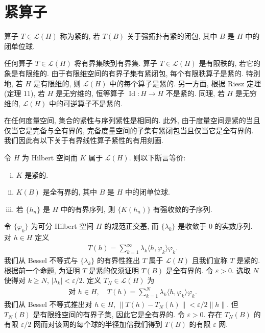 \documentclass[../../main.tex]{subfiles}
\begin{document}
\section{紧算子}\label{section:ch16-compact}

\begin{definition}[紧算子]\label{definition:ch16-compact}
算子 $T\in\mathcal{L}(H)$ 称为紧的, 若 $T(B)$ 关于强拓扑有紧的闭包, 其中 $B$ 是 $H$ 中的闭单位球.
\end{definition}

任何算子 $T\in\mathcal{L}(H)$ 将有界集映到有界集. 算子 $T\in\mathcal{L}(H)$ 是有限秩的, 若它的象是有限维的. 由于有限维空间的有界子集有紧闭包, 每个有限秩算子是紧的. 特别地, 若 $H$ 是有限维的, 则 $\mathcal{L}(H)$ 中的每个算子是紧的. 另一方面, 根据 Riesz 定理(定理 11), 若 $H$ 是无穷维的, 恒等算子 $\operatorname{Id}:H\to H$ 不是紧的. 同理, 若 $H$ 是无穷维的, $\mathcal{L}(H)$ 中的可逆算子不是紧的.

在任何度量空间, 集合的紧性与序列紧性是相同的. 此外, 由于度量空间是紧的当且仅当它是完备与全有界的, 完备度量空间的子集有紧闭包当且仅当它是全有界的. 我们因此有以下关于有界线性算子紧性的有用刻画.

\begin{proposition}\label{proposition:ch16-compact-equiv}
令 $H$ 为 Hilbert 空间而 $K$ 属于 $\mathcal{L}(H)$. 则以下断言等价:
\begin{enumerate}[(i)]
\item $K$ 是紧的.
\item $K(B)$ 是全有界的, 其中 $B$ 是 $H$ 中的闭单位球.
\item 若 $\{h_{n}\}$ 是 $H$ 中的有界序列, 则 $\{K(h_{n})\}$ 有强收敛的子序列.
\end{enumerate}
\end{proposition}

\begin{example}\label{example:ch16-diagonal-compact}
令 $\{\varphi_{k}\}$ 为可分 Hilbert 空间 $H$ 的规范正交基, 而 $\{\lambda_{k}\}$ 是收敛于 $0$ 的实数序列. 对 $h\in H$ 定义
\begin{align*}
T(h)=\sum_{k=1}^{\infty}\lambda_{k}\langle h,\varphi_{k}\rangle\varphi_{k}.
\end{align*}
我们从 Bessel 不等式与 $\{\lambda_{k}\}$ 的有界性推出 $T$ 属于 $\mathcal{L}(H)$ 且我们宣称 $T$ 是紧的. 根据前一个命题, 为证明 $T$ 是紧的仅须证明 $T(B)$ 是全有界的. 令 $\varepsilon>0$. 选取 $N$ 使得对 $k\geqslant N$, $|\lambda_{k}|<\varepsilon/2$. 定义 $T_{N}\in\mathcal{L}(H)$ 为
\begin{align*}
\text{对 }h\in H,\quad T(h)=\sum_{k=1}^{N}\lambda_{k}\langle h,\varphi_{k}\rangle\varphi_{k}.
\end{align*}
我们从 Bessel 不等式推出对 $h\in H$, $\|T(h)-T_{N}(h)\|<\varepsilon/2\|h\|$. 但 $T_{N}(B)$ 是有限维空间的有界子集, 因此它是全有界的. 令 $\varepsilon>0$. 存在 $T_{N}(B)$ 的有限 $\varepsilon/2$ 网而对该网的每个球的半径加倍我们得到 $T(B)$ 的有限 $\varepsilon$ 网.
\end{example}
\end{document}
